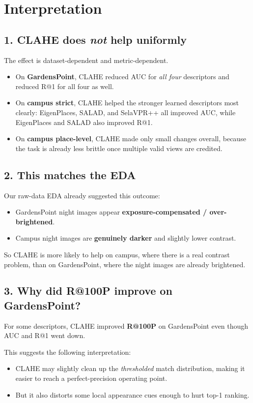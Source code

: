 \documentclass[11pt]{article}
\begin{document}
\section*{Interpretation}
\subsection*{1. CLAHE does \emph{not} help uniformly}
The effect is dataset-dependent and metric-dependent.
\begin{itemize}[leftmargin=*]
  \item On \textbf{GardensPoint}, CLAHE reduced AUC for \emph{all four} descriptors and reduced R@1 for all four as well.
  \item On \textbf{campus strict}, CLAHE helped the stronger learned descriptors most clearly: EigenPlaces, SALAD, and SelaVPR++ all improved AUC, while EigenPlaces and SALAD also improved R@1.
  \item On \textbf{campus place-level}, CLAHE made only small changes overall, because the task is already less brittle once multiple valid views are credited.
\end{itemize}

\subsection*{2. This matches the EDA}
Our raw-data EDA already suggested this outcome:
\begin{itemize}[leftmargin=*]
  \item GardensPoint night images appear \textbf{exposure-compensated / over-brightened}.
  \item Campus night images are \textbf{genuinely darker} and slightly lower contrast.
\end{itemize}

So CLAHE is more likely to help on campus, where there is a real contrast problem, than on GardensPoint, where the night images are already brightened.

\subsection*{3. Why did R@100P improve on GardensPoint?}
For some descriptors, CLAHE improved \textbf{R@100P} on GardensPoint even though AUC and R@1 went down.

This suggests the following interpretation:
\begin{itemize}[leftmargin=*]
  \item CLAHE may slightly clean up the \emph{thresholded} match distribution, making it easier to reach a perfect-precision operating point.
  \item But it also distorts some local appearance cues enough to hurt top-1 ranking.
\end{itemize}
\end{document}
